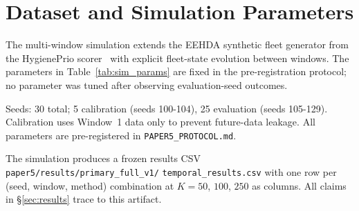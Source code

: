 \section{Dataset and Simulation Parameters}

The multi-window simulation extends the EEHDA synthetic fleet generator from the HygienePrio scorer~\cite{paper4hygieneprio} with explicit fleet-state evolution between windows. The parameters in Table~\ref{tab:sim_params} are fixed in the pre-registration protocol; no parameter was tuned after observing evaluation-seed outcomes.



Seeds: 30 total; 5 calibration (seeds 100-104), 25 evaluation (seeds 105-129). Calibration uses Window~1 data only to prevent future-data leakage. All parameters are pre-registered in \texttt{PAPER5\_PROTOCOL.md}.

The simulation produces a frozen results CSV \texttt{paper5/\allowbreak results/\allowbreak primary\_full\_v1/\allowbreak } \texttt{temporal\_results.csv} with one row per (seed, window, method) combination at $K=50$, $100$, $250$ as columns. All claims in \S\ref{sec:results} trace to this artifact.
